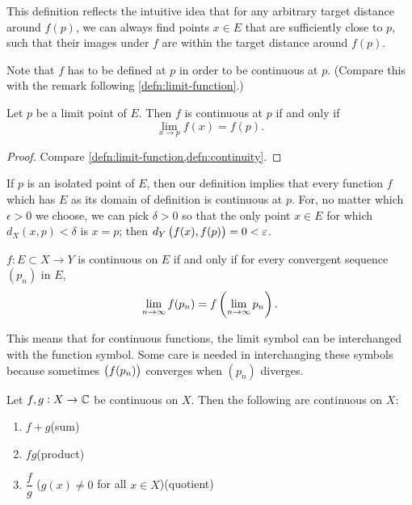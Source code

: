 \begin{remark}
This definition reflects the intuitive idea that for any arbitrary target distance around $f(p)$, we can always find points $x\in E$ that are sufficiently close to $p$, such that their images under $f$ are within the target distance around $f(p)$.
\end{remark}

\begin{remark}
Note that $f$ has to be defined at $p$ in order to be continuous at $p$. (Compare this with the remark following \cref{defn:limit-function}.) 
\end{remark}

\begin{lemma}\label{lemma:continuity-limit}
Let $p$ be a limit point of $E$. Then $f$ is continuous at $p$ if and only if
\[\lim_{x\to p}f(x)=f(p).\]
\end{lemma}

\begin{proof}
Compare \cref{defn:limit-function,defn:continuity}.
\end{proof}

If $p$ is an isolated point of $E$, then our definition implies that every function $f$ which has $E$ as its domain of definition is continuous at $p$. For, no matter which $\epsilon>0$ we choose, we can pick $\delta>0$ so that the only point $x\in E$ for which $d_X(x,p)<\delta$ is $x=p$; then $d_Y\left(f(x),f(p)\right)=0<\varepsilon$.

\begin{corollary}
$f:E\subset X\to Y$ is continuous on $E$ if and only if for every convergent sequence $(p_n)$ in $E$,
\[\lim_{n\to\infty}f(p_n)=f\left(\lim_{n\to\infty}p_n\right).\]
\end{corollary}

\begin{remark}
This means that for continuous functions, the limit symbol can be interchanged with the function symbol. Some care is needed in interchanging these symbols because sometimes $\left(f(p_n)\right)$ converges when $(p_n)$ diverges.
\end{remark}

\begin{lemma}
Let $f,g:X\to\mathbb C$ be continuous on $X$. Then the following are continuous on $X$:
\begin{enumerate}[label=(\roman*)]
\item $f+g$\hfill(sum)
\item $fg$\hfill(product)
\item $\dfrac{f}{g}$ ($g(x)\neq0$ for all $x\in X$)\hfill(quotient)
\end{enumerate}
\end{lemma}

